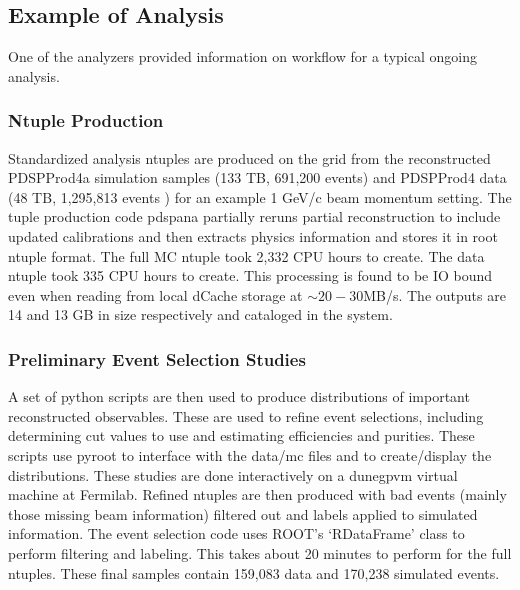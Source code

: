 \documentclass[../main-v1.tex]{subfiles}
\begin{document}
\subsection{Example of  Analysis }


One of the  analyzers %
provided information on workflow for a typical ongoing analysis. 


\subsubsection{Ntuple Production}

Standardized analysis ntuples are produced on the grid from the reconstructed PDSPProd4a simulation samples (133 TB, 691,200 events)  and  PDSPProd4 data (48 TB, 1,295,813 events )  for an example 1 GeV/c beam momentum setting. The tuple production code pdspana  partially reruns partial reconstruction to include updated calibrations and then extracts physics information and stores it in root ntuple format. The full MC ntuple took 2,332 CPU hours to create. The data ntuple took 335 CPU hours to create. This processing is found to be IO bound even when reading from local dCache storage at $\sim 20-30 $MB/s. The outputs are 14 and 13 GB in size respectively and cataloged in the  system.  

\subsubsection{Preliminary Event Selection Studies}

A set of python scripts are then used to produce distributions of important reconstructed observables. These are used to refine event selections, including determining cut values to use and estimating efficiencies and purities. These scripts use pyroot to interface with the data/mc files and to create/display the distributions. These studies  are done interactively on a dunegpvm virtual machine at Fermilab.
Refined ntuples are then produced with bad events (mainly those missing beam information) filtered out and labels applied to simulated information. The event selection code uses ROOT’s `RDataFrame' class to perform filtering and labeling. This takes about 20 minutes to perform for the full ntuples.  These final samples contain 159,083 data and 170,238 simulated events. 
\end{document}
